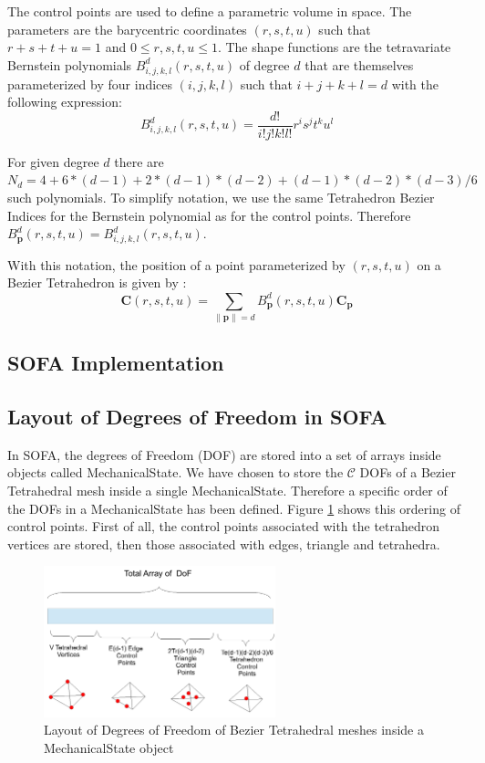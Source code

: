 \documentclass[a4paper,11pt]{article}
\newcommand{\controls}{{\mathcal C}}
\newcommand{\control}{{\mathbf C}}
\newcommand{\degree}{{d}}
\begin{document}
The control points are used to define a parametric volume in space. The parameters are the barycentric coordinates $(r,s,t,u)$ such that $r+s+t+u=1$ and $0\leq r,s,t,u \leq 1$. The shape functions are the tetravariate Bernstein polynomials $B^d_{i,j,k,l}(r,s,t,u)$ of degree $d$ that are themselves parameterized by four indices $(i,j,k,l)$ such that $i+j+k+l=d$ with the following expression:
\[
B^\degree_{i,j,k,l}(r,s,t,u)=\frac{\degree!}{i! j! k! l!} r^i s^j t^k u ^l
\]

For given degree $d$ there are $N_d=4+6*(\degree-1)+2*(\degree-1)*(\degree-2)+(\degree-1)*(\degree-2)*(\degree-3)/6$ such polynomials. To simplify notation, we use the same Tetrahedron Bezier Indices for the Bernstein polynomial as for the control points. Therefore $B^d_{\mathbf p}(r,s,t,u)=B^d_{i,j,k,l}(r,s,t,u)$.

With this notation, the position of a point parameterized by $(r,s,t,u)$ on a Bezier Tetrahedron is given by :
\[
\control(r,s,t,u)=\sum_{\|\mathbf p\|=\degree}  B^d_{\mathbf p}(r,s,t,u) \control_{\mathbf p}
\]

\subsection{SOFA Implementation}

\subsection{Layout of Degrees of Freedom in SOFA}

In SOFA, the degrees of Freedom (DOF) are stored into a set of arrays inside objects called MechanicalState.
We have chosen to store the $\controls$ DOFs of a Bezier Tetrahedral mesh inside a single MechanicalState. Therefore a specific order of the DOFs in a MechanicalState has been defined. 
Figure \ref{fig:LayoutBezierTetrahedron} shows this ordering of control points. First of all, the control points associated with the tetrahedron vertices are stored, then those associated with edges, triangle and tetrahedra.

\begin{figure}[!htbp]
	\centering
    \includegraphics[width=0.60\textwidth]{DofLayoutBezierTetrahedron}
	\caption{Layout of Degrees of Freedom of Bezier Tetrahedral meshes inside a MechanicalState object}
	\label{fig:LayoutBezierTetrahedron}
\end{figure}
\end{document}
